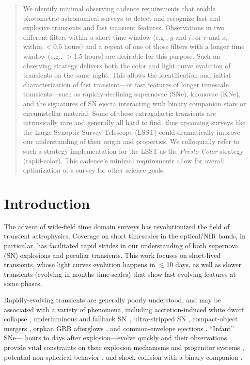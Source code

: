 \documentclass[letterpaper,longauthor,trackchanges,twocolumn,onecolappendix,sort&compress]{aastex62}
\begin{document}
 \begin{abstract}
 
We identify minimal observing cadence requirements that enable photometric astronomical surveys to detect and recognize fast and explosive transients and fast transient features. Observations in two different filters within a short time window (e.g., $g$-and-$i$, or $r$-and-$z$, within $<0.5$ hours) and a repeat of one of those filters with a longer time window (e.g., $>1.5$ hours) are desirable for this purpose. Such an observing strategy delivers both the color and light curve evolution of transients on the same night.     This allows the identification and initial characterization of fast transient---or fast features of longer timescale transients---such as rapidly-declining supernovae (SNe), kilonovae (KNe), and the signatures of SN ejecta interacting with binary companion stars or circumstellar material. Some of these extragalactic transients are intrinsically rare and generally all hard to find, thus upcoming surveys like the Large Synoptic Survey Telescope (LSST) could dramatically improve our understanding of their origin and properties. We colloquially refer to such a strategy implementation for the LSST as the {\em Presto-Color} strategy (rapid-color). This cadence's minimal requirements allow for overall optimization of a survey for other science goals.
\end{abstract}


%
\section{Introduction}\label{sec:intro}

The advent of wide-field time domain surveys has revolutionized the field of transient astrophysics. Coverage on short timescales in the optical/NIR bands, in particular, has facilitated rapid strides in our understanding of both supernova (SN) explosions and peculiar transients. This work focuses on short-lived transients, whose light curves evolution happens in $\lesssim$10 days, as well as slower transients (evolving in months time scales) that show fast evolving features at some phases.

Rapidly-evolving transients are generally poorly understood, and may be associated with a variety of phenomena, including accretion-induced white dwarf collapse \citep{Metzger2009}, underluminous and fallback SN~\citep{Moriya2010}, ultra-stripped SN \citep{Drout2013,Kasliwal2010,Tauris2015,De2018}, compact-object mergers \citep{Kasen2015,Metzger2010}, orphan GRB afterglows \citep{Totani2002}, and common-envelope ejections \citep{Blagorodnova2017}. ``Infant'' SNe--- hours to days after explosion---evolve quickly and their observations provide vital constraints on their explosion mechanisms and progenitor systems \citep{Nakar2010,Rabinak2011,Nugent2011}, potential non-spherical behavior \citep{Matzner2013,Salbi2014}, and shock collision with a binary companion \citep{Kasen2010}. 
\end{document}
